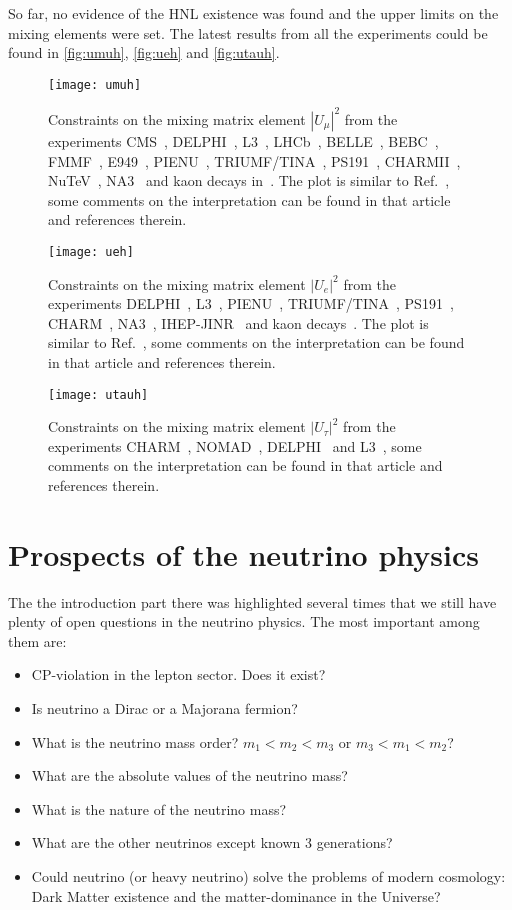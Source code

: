 \documentclass[../main.tex]{subfiles}
\begin{document}
So far, no evidence of the HNL existence was found and the upper limits on the mixing elements were set. The latest results from all the experiments could be found in \autoref{fig:umuh}, \autoref{fig:ueh} and \autoref{fig:utauh}.

\begin{figure}[!ht]
\texttt{[image: umuh]}
\caption{Constraints on the mixing matrix element $|U_{\mu}|^2$ from the experiments CMS~\cite{cms}, DELPHI~\cite{delphi}, L3~\cite{l3}, LHCb~\cite{lhcb}, BELLE~\cite{belle}, BEBC~\cite{bebc}, FMMF~\cite{fmmf}, E949~\cite{e949}, PIENU~\cite{pienu}, TRIUMF/TINA~\cite{triumf}, PS191~\cite{Bernardi1988}, CHARMII~\cite{charm2}, NuTeV~\cite{nutev}, NA3~\cite{na3} and kaon decays in~\cite{kaon1,kaon2}. The plot is similar to Ref.~\cite{drewes}, some comments on the interpretation can be found in that article and references therein.}
\label{fig:umuh}
\end{figure}
\begin{figure}[!ht]
\texttt{[image: ueh]}
\caption{Constraints on the mixing matrix element $|U_{e}|^2$ from the experiments  DELPHI~\cite{delphi},  L3~\cite{l3}, PIENU~\cite{pienu}, TRIUMF/TINA~\cite{triumf}, PS191~\cite{Bernardi1988}, CHARM~\cite{charm}, NA3~\cite{na3}, IHEP-JINR~\cite{jinr} and kaon decays~\cite{kaon1}. The plot is similar to Ref.~\cite{drewes}, some comments on the interpretation can be found in that article and references therein.}
\label{fig:ueh}
\end{figure}
\begin{figure}[!ht]
\texttt{[image: utauh]}
\caption{Constraints on the mixing matrix element $|U_{\tau}|^2$ from the experiments  CHARM~\cite{orloff2002limits}, NOMAD~\cite{baldisseris2001search}, DELPHI~\cite{delphi} and L3~\cite{l3}, some comments on the interpretation can be found in that article and references therein.}
\label{fig:utauh}
\end{figure}

\chapter{Prospects of the neutrino physics}
The the introduction part there was highlighted several times that we still have plenty of open questions in the neutrino physics. The most important among them are:
\begin{itemize}
  \item CP-violation in the lepton sector. Does it exist?
  \item Is neutrino a Dirac or a Majorana fermion?
  \item What is the neutrino mass order? $m_1<m_2<m_3$ or $m_3<m_1<m_2$?
  \item What are the absolute values of the neutrino mass?
  \item What is the nature of the neutrino mass?
  \item What are the other neutrinos except known 3 generations?
  \item Could neutrino (or heavy neutrino) solve the problems of modern cosmology: Dark Matter existence and the matter-dominance in the Universe?
\end{itemize}
\end{document}
